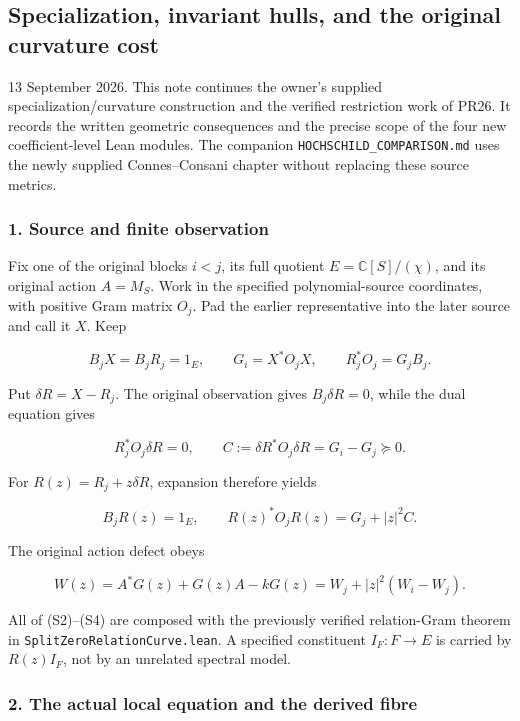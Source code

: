 \subsection{Specialization, invariant hulls, and the original curvature cost}\label{endpoint-cc_specialization--specialization-invariant-hulls-and-the-original-curvature-cost}

13 September 2026. This note continues the owner's supplied specialization/curvature construction and the verified restriction work of PR26. It records the written geometric consequences and the precise scope of the four new coefficient-level Lean modules. The companion \nolinkurl{HOCHSCHILD_COMPARISON.md} uses the newly supplied Connes--Consani chapter without replacing these source metrics.

\subsubsection{1. Source and finite observation}\label{endpoint-cc_specialization--source-and-finite-observation}

Fix one of the original blocks \(i<j\), its full quotient \(E=\mathbb C[S]/(\chi)\), and its original action \(A=M_S\). Work in the specified polynomial-source coordinates, with positive Gram matrix \(O_j\). Pad the earlier representative into the later source and call it \(X\). Keep

\[
B_jX=B_jR_j=1_E,\qquad G_i=X^*O_jX,\qquad R_j^*O_j=G_jB_j.
\tag{S1}
\]

Put \(\delta R=X-R_j\). The original observation gives \(B_j\delta R=0\), while the dual equation gives

\[
R_j^*O_j\delta R=0,\qquad
C:=\delta R^*O_j\delta R=G_i-G_j\succeq0.
\tag{S2}
\]

For \(R(z)=R_j+z\delta R\), expansion therefore yields

\[
B_jR(z)=1_E,\qquad R(z)^*O_jR(z)=G_j+|z|^2C.
\tag{S3}
\]

The original action defect obeys

\[
W(z)=A^*G(z)+G(z)A-kG(z)=W_j+|z|^2(W_i-W_j).
\tag{S4}
\]

All of (S2)--(S4) are composed with the previously verified relation-Gram theorem in \nolinkurl{SplitZeroRelationCurve.lean}. A specified constituent \(I_F:F\to E\) is carried by \(R(z)I_F\), not by an unrelated spectral model.

\subsubsection{2. The actual local equation and the derived fibre}\label{endpoint-cc_specialization--the-actual-local-equation-and-the-derived-fibre}


